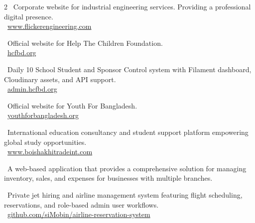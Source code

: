 \documentclass[10pt,a4paper,ragged2e,withhyper]{files/altacv}
\begin{document}

\begin{paracol}{2}
    \small \faChevronRight \ Corporate website for industrial engineering services. Providing a professional digital presence. \\[0.5em]
    \small \faGlobe \ \href{https://www.flickerengineering.com}{www.flickerengineering.com}

    \divider

    \small \faChevronRight \ Official website for Help The Children Foundation. \\[0.5em]
    \small \faGlobe \ \href{https://hcfbd.org}{hcfbd.org}

    \divider

    \small \faChevronRight \ Daily 10 School Student and Sponsor Control system with Filament dashboard, Cloudinary assets, and API support. \\[0.5em]
    \small \faGlobe \ \href{https://admin.hcfbd.org}{admin.hcfbd.org}

    \divider

    \small \faChevronRight \ Official website for Youth For Bangladesh. \\[0.5em]
    \small \faGlobe \ \href{https://youthforbangladesh.org}{youthforbangladesh.org}

    \divider

    \small \faChevronRight \ International education consultancy and student support platform empowering global study opportunities. \\[0.5em]
    \small \faGlobe \ \href{https://www.boishakhitradeint.com}{www.boishakhitradeint.com}

    \divider

    \small \faChevronRight \ A web-based application that provides a comprehensive solution for managing inventory, sales, and expenses for businesses with multiple branches.

    \divider

    \small \faChevronRight \ Private jet hiring and airline management system featuring flight scheduling, reservations, and role-based admin user workflows. \\[0.5em]
    \small \faGithub \ \href{https://github.com/siMobin/airline-reservation-system}{github.com/siMobin/airline-reservation-system}


\end{paracol}
\end{document}
